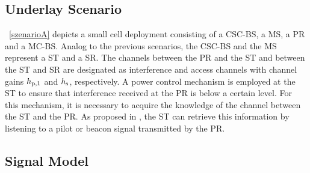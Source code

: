 \subsection{Underlay Scenario}
\label{scenario}
\figurename~\ref{szenarioA} depicts a small cell deployment consisting of a CSC-BS, a MS, a PR and a MC-BS. Analog to the previous scenarios, the CSC-BS and the MS represent a ST and a SR. The channels between the PR and the ST and between the ST and SR are designated as interference and access channels with channel gains $h_{\text{p,1}}$ and $h_{\text{s}}$, respectively. A power control mechanism is employed at the ST to ensure that interference received at the PR is below a certain level. For this mechanism, it is necessary to acquire the knowledge of the channel between the ST and the PR. As proposed in \cite{Kaushik15}, the ST can retrieve this information by listening to a pilot or beacon signal transmitted by the PR. %

\subsection{Signal Model}

